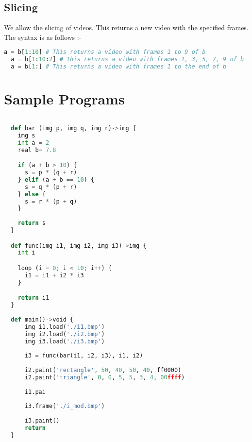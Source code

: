 \documentclass[a4paper, 11pt]{article}
\begin{document}
    \subsection{Slicing}
  We allow the slicing of videos. This returns a new video with the specified frames. The syntax is as follows :-
  \begin{lstlisting}[language=Python]
  a = b[1:10] # This returns a video with frames 1 to 9 of b
  a = b[1:10:2] # This returns a video with frames 1, 3, 5, 7, 9 of b
  a = b[1:] # This returns a video with frames 1 to the end of b
  \end{lstlisting}





\section{Sample Programs}

\begin{lstlisting}[language=Python]
  
  def bar (img p, img q, img r)->img {
    img s
    int a = 2
    real b= 7.8

    if (a + b > 10) {
      s = p * (q + r)
    } elif (a + b == 10) {
      s = q * (p + r)
    } else {
      s = r * (p + q)
    }
      
    return s
  }

  def func(img i1, img i2, img i3)->img {
    int i

    loop (i = 0; i < 10; i++) {
      i1 = i1 + i2 * i3
    }

    return i1
  }
  
  def main()->void {
      img i1.load('./i1.bmp')
      img i2.load('./i2.bmp')
      img i3.load('./i3.bmp')
  
      i3 = func(bar(i1, i2, i3), i1, i2)
  
      i2.paint('rectangle', 50, 40, 50, 40, ff0000)
      i2.paint('triangle', 0, 0, 5, 5, 3, 4, 00ffff)
  
      i1.pai
  
      i3.frame('./i_mod.bmp')
  
      i3.paint()
      return
  }
\end{lstlisting}
\end{document}
